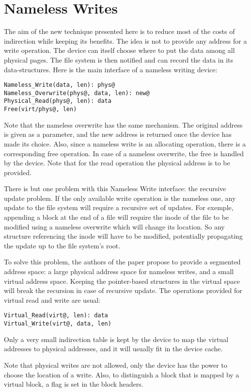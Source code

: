 \documentclass[twocolumn,a4paper,10pt]{article}
\begin{document}
\section*{Nameless Writes}
The aim of the new technique presented here is to reduce most of the costs of
indirection while keeping its benefits. The idea is not to provide any address
for a write operation. The device can itself choose where to put the data
among all physical pages. The file system is then notified and can record the
data in its data-structures. Here is the main interface of a nameless writing
device:
\begin{lstlisting}
Nameless_Write(data, len): phys@
Nameless_Overwrite(phys@, data, len): new@
Physical_Read(phys@, len): data
Free(virt/phys@, len)
\end{lstlisting}
Note that the nameless overwrite has the same mechanism. The original address
is given as a parameter, and the new address is returned once the device has
made its choice. Also, since a nameless write is an allocating operation,
there is a corresponding free operation. In case of a nameless overwrite, the
free is handled by the device. Note that for the read operation the physical
address is to be provided.

There is but one problem with this Nameless Write interface: the recursive
update problem. If the only available write operation is the nameless one, any
update to the file system will require a recursive set of updates. For
exemple, appending a block at the end of a file will require the inode of the
file to be modified using a nameless overwrite which will change its location.
So any structure referencing the inode will have to be modified, potentially
propagating the update up to the file system's root.

To solve this problem, the authors of the paper propose to provide a segmented
address space: a large physical address space for nameless writes, and a small
virtual address space. Keeping the pointer-based structures in the virtual
space will break the recursion in case of recursive update. The operations
provided for virtual read and write are usual:
\begin{lstlisting}
Virtual_Read(virt@, len): data
Virtual_Write(virt@, data, len)
\end{lstlisting}
Only a very small indirection table is kept by the device to map the virtual
addresses to physical addresses, and it will usually fit in the device cache.

Note that physical writes are not allowed, only the device has the power to
choose the location of a write. Also, to distinguish a block that is mapped by
a virtual block, a flag is set in the block headers.
\end{document}

